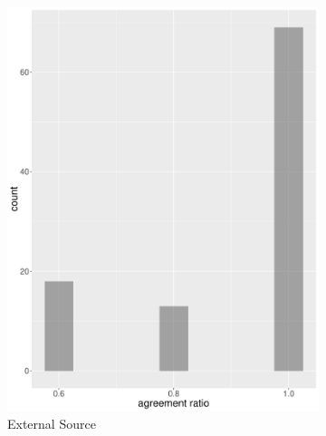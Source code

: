 \begin{figure}
\begin{subfigure}[b]{0.4\textwidth}
        \includegraphics[width=\textwidth]{plots/hist_agreement_es}
        \caption{External Source}
        \label{fig:hist_agreement_es}
    \end{subfigure}
    ~
    \begin{subfigure}[b]{0.4\textwidth}

\end{subfigure}
\end{figure}
